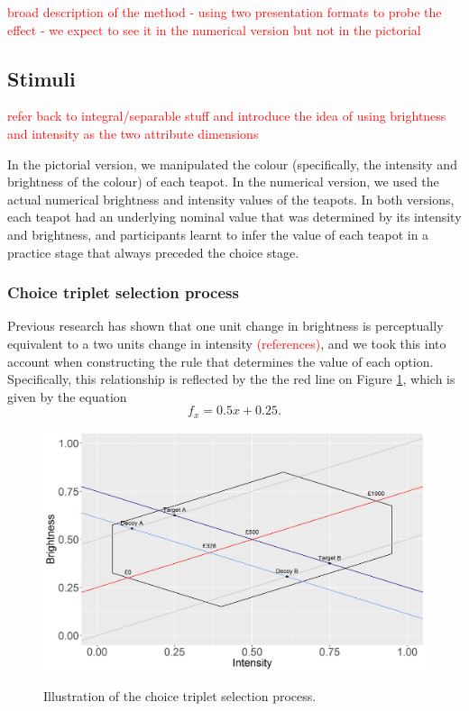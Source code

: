 \documentclass[11pt,a4paper]{article}
\begin{document}
\textcolor{red}{broad description of the method - using two presentation formats to probe the effect - we expect to see it in the numerical version but not in the pictorial}

\subsection{Stimuli}


\textcolor{red}{refer back to integral/separable stuff and introduce the idea of using brightness and intensity as the two attribute dimensions}


In the pictorial version, we manipulated the colour (specifically, the intensity and brightness of the colour) of each teapot. In the numerical version, we used the actual numerical brightness and intensity values of the teapots. In both versions, each teapot had an underlying nominal value that was determined by its intensity and brightness, and participants learnt to infer the value of each teapot in a practice stage that always preceded the choice stage. 

\subsubsection{Choice triplet selection process}


Previous research has shown that one unit change in brightness is perceptually equivalent to a two units change in intensity \textcolor{red} {(references)}, and we took this into account when constructing the rule that determines the value of each option. Specifically, this relationship is reflected by the the red line on Figure \ref{fig:explain}, which is given by the equation
\begin{equation} \label{eq:redline}
 f_{x} = 0.5x + 0.25.
\end{equation}


\begin{figure}
\centering
\caption{Illustration of the choice triplet selection process.}
\includegraphics[width=1\textwidth]{Figure_1poly.png}
\label{fig:explain}
\end{figure}
\end{document}
